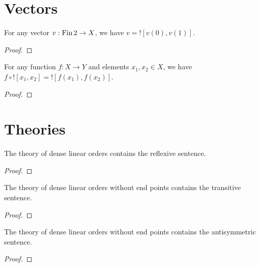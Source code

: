 
\section{Vectors}

\begin{lemma}
    \label{lem:vector-notation}
    \leanok
    For any vector $v : \operatorname{Fin} 2 \to X$, we have $v = ![v(0), v(1)]$.
\end{lemma}
\begin{proof}
    \leanok
\end{proof}

\begin{lemma}
    \label{lem:vector-notation-under-composition}
    \leanok
    For any function $f : X \to Y$ and elements $x_1, x_2 \in X$, we have $f \circ ![x_1, x_2] = ![f(x_1), f(x_2)]$.
\end{lemma}
\begin{proof}
    \leanok
\end{proof}


\section{Theories}

\begin{lemma}
    \label{lem:reflexive_mem_dlo}
    \leanok
    The theory of dense linear orders contains the reflexive sentence.
\end{lemma}
\begin{proof}
    \leanok
\end{proof}

\begin{lemma}
    \label{lem:transitive_mem_dlo}
    \leanok
    The theory of dense linear orders without end points contains the transitive sentence.
\end{lemma}
\begin{proof}
    \leanok
\end{proof}

\begin{lemma}
    \label{lem:antisymmetric_mem_dlo}
    \leanok
    The theory of dense linear orders without end points contains the antisymmetric sentence.
\end{lemma}
\begin{proof}
    \leanok
\end{proof}

